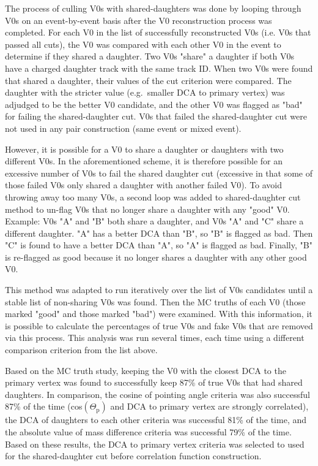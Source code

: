 The process of culling V0s with shared-daughters was done by looping through V0s on an event-by-event basis after the V0 reconstruction process was completed.  
For each V0 in the list of successfully reconstructed V0s (i.e. V0s that passed all cuts), the V0 was compared with each other V0 in the event to determine if they shared a daughter.  
Two V0s "share" a daughter if both V0s have a charged daughter track with the same track ID.  
When two V0s were found that shared a daughter, their values of the cut criterion were compared.  
The daughter with the stricter value (e.g.\ smaller DCA to primary vertex) was adjudged to be the better V0 candidate, and the other V0 was flagged as "bad" for failing the shared-daughter cut.  
V0s that failed the shared-daughter cut were not used in any pair construction (same event or mixed event).

However, it is possible for a V0 to share a daughter or daughters with two different V0s. 
In the aforementioned scheme, it is therefore possible for an excessive number of V0s to fail the shared daughter cut (excessive in that some of those failed V0s only shared a daughter with another failed V0).  
To avoid throwing away too many V0s, a second loop was added to shared-daughter cut method to un-flag V0s that no longer share a daughter with any "good" V0. 
Example: V0s "A" and "B" both share a daughter, and V0s "A" and "C" share a different daughter.  "A" has a better DCA than "B", so "B" is flagged as bad.  
Then "C" is found to have a better DCA than "A", so "A" is flagged as bad.  
Finally, "B" is re-flagged as good because it no longer shares a daughter with any other good V0.

This method was adapted to run iteratively over the list of V0s candidates until a stable list of non-sharing V0s was found.  
Then the MC truths of each V0 (those marked "good" and those marked "bad") were examined.  
With this information, it is possible to calculate the percentages of true V0s and fake V0s that are removed via this process.  
This analysis was run several times, each time using a different comparison criterion from the list above.

Based on the MC truth study, keeping the V0 with the closest DCA to the primary vertex was found to successfully keep 87\% of true V0s that had shared daughters.  
In comparison, the cosine of pointing angle criteria was also successful 87\% of the time (cos$(\Theta_\mathrm{p})$ and DCA to primary vertex are strongly correlated), the DCA of daughters to each other criteria was successful 81\% of the time, and the absolute value of mass difference criteria was successful 79\% of the time.
Based on these results, the DCA to primary vertex criteria was selected to used for the shared-daughter cut before correlation function construction.

